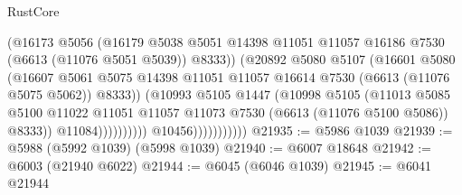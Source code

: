 \begin{lexlean}{RustCore}
\begin{coremodule}
                                          (@16173
                                            @5056
                                            (@16179
                                              @5038
                                              @5051
                                              @14398
                                              @11051
                                              @11057
                                              @16186
                                              @7530
                                              (@6613 (@11076 @5051 @5039))
                                              @8333))
                                          (@20892
                                            @5080
                                            @5107
                                            (@16601
                                              @5080
                                              (@16607
                                                @5061
                                                @5075
                                                @14398
                                                @11051
                                                @11057
                                                @16614
                                                @7530
                                                (@6613 (@11076 @5075 @5062))
                                                @8333))
                                            (@10993
                                              @5105
                                              @1447
                                              (@10998
                                                @5105
                                                (@11013
                                                  @5085
                                                  @5100
                                                  @11022
                                                  @11051
                                                  @11057
                                                  @11073
                                                  @7530
                                                  (@6613 (@11076 @5100 @5086))
                                                  @8333))
                                              @11084))))))))))
                          @10456)))))))))))
@21935 := @5986 @1039
@21939 := @5988 (@5992 @1039) (@5998 @1039)
@21940 := @6007 @18648
@21942 := @6003 (@21940 @6022)
@21944 := @6045 (@6046 @1039)
@21945 := @6041 @21944

\end{coremodule}
\end{lexlean}
